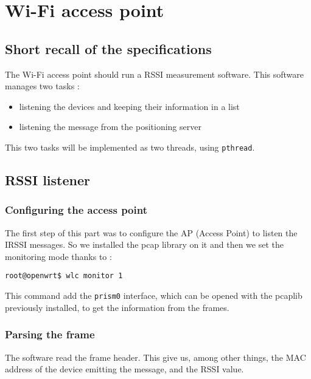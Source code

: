 \section{Wi-Fi access point}

\subsection{Short recall of the specifications}

The Wi-Fi access point should run a RSSI measurement software. This software
manages two tasks :

\begin{itemize}
    \item listening the devices and keeping their information in a list
    \item listening the message from the positioning server
\end{itemize}

This two tasks will be implemented as two threads, using \verb+pthread+.

\subsection{RSSI listener}

\subsubsection{Configuring the access point}

The first step of this part was to configure the AP (Access Point) to listen
the IRSSI messages. So we installed the pcap library on it and then we set the
monitoring mode thanks to :

\begin{verbatim}
root@openwrt$ wlc monitor 1
\end{verbatim}

This command add the \verb+prism0+ interface, which can be opened with the
pcaplib previously installed, to get the information from the frames.

\subsubsection{Parsing the frame}

The software read the frame header. This give us, among other things, 
the MAC address of the device emitting the message, and the RSSI value.

